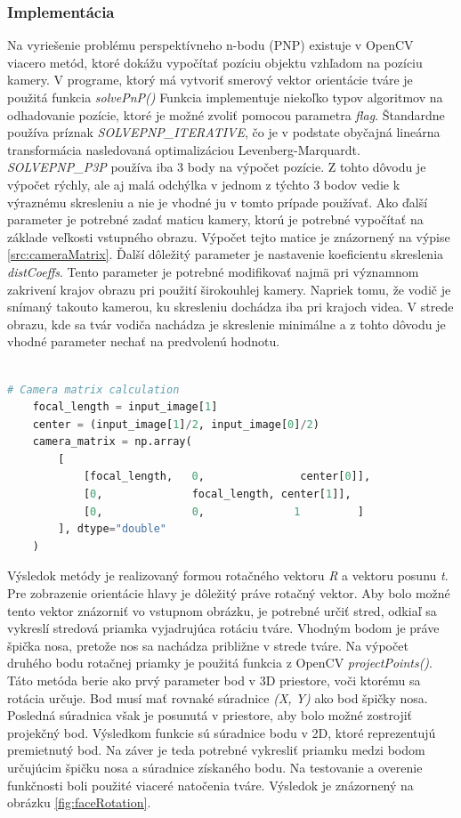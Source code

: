 \documentclass[slovak,master,dept460,male,cpp,cpdeclaration]{diploma}
\begin{document}
\subsubsection*{Implementácia}
Na vyriešenie problému perspektívneho n-bodu (PNP) existuje v OpenCV viacero metód, ktoré dokážu vypočítať  pozíciu objektu vzhľadom na pozíciu kamery. V programe, ktorý má vytvoriť smerový vektor orientácie tváre  je použitá funkcia \textit{solvePnP()} Funkcia implementuje niekoľko typov algoritmov na odhadovanie pozície, ktoré je možné zvoliť pomocou parametra \textit{flag}. Štandardne používa príznak \textit{SOLVEPNP\_ITERATIVE}, čo je v podstate obyčajná lineárna transformácia nasledovaná optimalizáciou Levenberg-Marquardt. \textit{SOLVEPNP\_P3P} používa iba 3 body na výpočet pozície. Z tohto dôvodu je výpočet rýchly, ale  aj malá odchýlka  v jednom z týchto 3 bodov vedie k výraznému skresleniu a nie je vhodné ju v tomto prípade používať.  Ako ďalší parameter je potrebné  zadať  maticu kamery, ktorú je potrebné vypočítať na základe veľkosti vstupného obrazu. Výpočet tejto matice je znázornený na výpise \ref{src:cameraMatrix}. Ďalší dôležitý parameter je nastavenie koeficientu skreslenia \textit{distCoeffs}. Tento parameter je potrebné modifikovať najmä pri významnom zakrivení krajov obrazu pri použití širokouhlej kamery. Napriek tomu, že vodič je snímaný  takouto kamerou, ku skresleniu dochádza iba pri krajoch videa. V strede obrazu, kde sa tvár vodiča nachádza je skreslenie minimálne a z tohto dôvodu je vhodné parameter nechať na predvolenú hodnotu.
\\\\
\begin{lstlisting}[language=Python,label=src:cameraMatrix,caption={Výpočet  matice kamery}]
    # Camera matrix calculation
    focal_length = input_image[1]
    center = (input_image[1]/2, input_image[0]/2)
    camera_matrix = np.array(
        [
            [focal_length,   0,               center[0]],
            [0,              focal_length, center[1]],
            [0,              0,              1         ]
        ], dtype="double"
    )
\end{lstlisting}

\newpage
Výsledok metódy je realizovaný formou rotačného vektoru \textit{R} a vektoru posunu \textit{t}. Pre zobrazenie orientácie hlavy je dôležitý práve rotačný vektor. Aby  bolo možné tento vektor znázorniť vo vstupnom obrázku, je potrebné určiť stred, odkiaľ sa vykreslí stredová priamka vyjadrujúca rotáciu tváre. Vhodným bodom je práve špička nosa, pretože nos sa nachádza približne v strede tváre. Na výpočet druhého bodu rotačnej priamky je použitá funkcia z OpenCV \textit{projectPoints()}. Táto metóda berie ako prvý parameter bod v 3D priestore, voči ktorému sa rotácia určuje. Bod musí mať rovnaké súradnice \textit{(X, Y)} ako bod špičky nosa. Posledná súradnica však je posunutá v priestore, aby bolo možné zostrojiť projekčný bod. Výsledkom funkcie sú súradnice bodu v 2D, ktoré reprezentujú premietnutý bod. Na záver je teda potrebné vykresliť priamku medzi bodom určujúcim špičku nosa a súradnice získaného bodu. Na testovanie a overenie funkčnosti boli použité viaceré natočenia tváre. Výsledok je znázornený na obrázku \ref{fig:faceRotation}.
\end{document}
